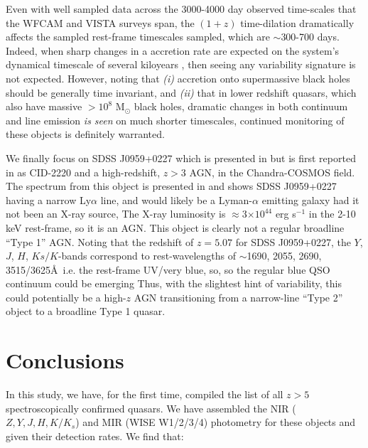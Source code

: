 \documentclass[usenatbib]{mnras}
\begin{document}
Even with well sampled data across the 3000-4000 day observed
time-scales that the WFCAM and VISTA surveys span, the $(1+z)$
time-dilation dramatically affects the sampled rest-frame timescales
sampled, which are $\sim$300-700 days. Indeed, when sharp changes in a
accretion rate are expected on the system's dynamical timescale of
several kiloyears \citep[e.g.,][]{Regan2019}, then seeing any
variability signature is not expected. However, noting that {\it (i)} accretion onto 
supermassive black holes should be generally time invariant, and {\it (ii)} 
that in lower redshift quasars, which also have massive $>$$10^{8}$ M$_{\odot}$ black
holes, dramatic changes in both continuum and line emission {\it is
seen} on much shorter timescales, continued monitoring of these
objects is definitely warranted.

We finally focus on SDSS J0959+0227 which is presented in
\citet{WangF2016} but is first reported in \citet{Civano2011} as
CID-2220 and a high-redshift, $z>3$ AGN, in the Chandra-COSMOS
field. The spectrum from this object is presented in \citet{Ikeda2012}
and shows SDSS J0959+0227 having a narrow Ly$\alpha$ line, and would
likely be a Lyman-$\alpha$ emitting galaxy had it not been an X-ray
source, The X-ray luminosity is $\approx$3$\times10^{44}$ erg s$^{-1}$
in the 2-10 keV rest-frame, so it is an AGN. This object is clearly
not a regular broadline ``Type 1'' AGN. Noting that the redshift of
$z=5.07$ for SDSS J0959+0227, the $Y$, $J$, $H$, $Ks/K$-bands
correspond to rest-wavelengths of $\sim$1690, 2055, 2690,
3515/3625\AA\ i.e. the rest-frame UV/very blue, so, so the regular
blue QSO continuum could be emerging Thus, with the slightest hint of
variability, this could potentially be a high-$z$ AGN transitioning
from a narrow-line ``Type 2'' object to a broadline Type 1 quasar.



\section{Conclusions}\label{sec:conclusions}
In this study, we have, for the first time, compiled the list of all
$z>5$ spectroscopically confirmed quasars. We have assembled the NIR
($Z, Y, J, H, K/K_{s}$) and MIR (WISE W1/2/3/4) photometry for these
objects and given their detection rates. We find that:
\end{document}
